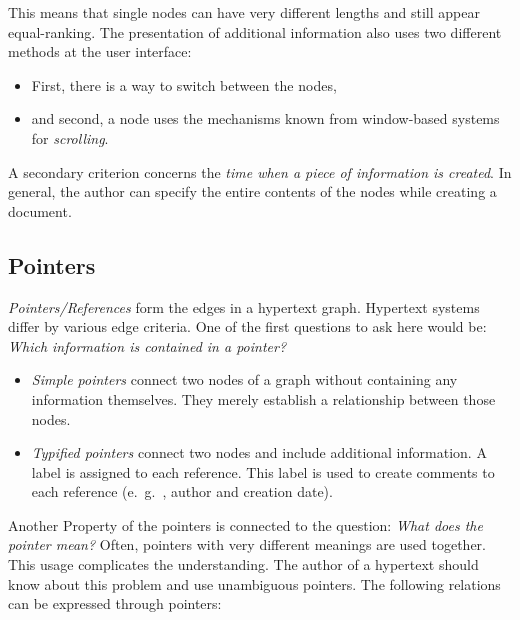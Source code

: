 This means that single nodes can have very different lengths and still appear equal-ranking. The presentation of additional information also uses two different methods at the user interface: 

	\begin{itemize}
			\item First, there is a way to switch between the nodes,
			\item and second, a node uses the mechanisms known from window-based systems for \textit{scrolling}.
	\end{itemize}

	

\noindent A secondary criterion concerns the \textit{time when a piece of information is created}. In general, the author can specify the entire contents of the nodes while creating a document.

\subsection{Pointers}
\textit{Pointers/References} form the edges in a hypertext graph. Hypertext systems differ by various edge criteria. One of the first questions to ask here would be: \textit{Which information is contained in a pointer?}

\begin{multicols}{2}
	\begin{itemize}
		\item \textit{Simple pointers} connect two nodes of a graph without containing any information themselves. They merely establish a relationship between those nodes.
		
		\item \textit{Typified pointers} connect two nodes and include additional information. A label is assigned to each reference. This label is used to create comments to each reference (e.\ g.\ , author and creation date).
	\end{itemize}
\end{multicols}


Another Property of the pointers is connected to the question: \textit{What does the pointer mean?} Often, pointers with very different meanings are used together. This usage complicates the understanding. The author of a hypertext should know about this problem and use unambiguous pointers. The following relations can be expressed through pointers:

